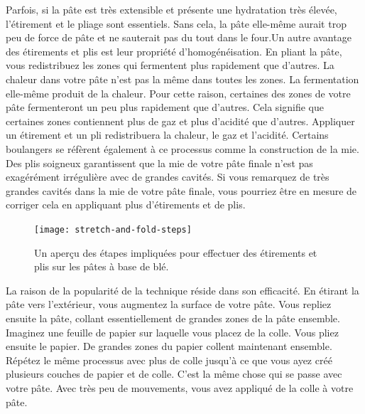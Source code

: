 Parfois, si la pâte est très extensible
et présente une hydratation très élevée, l'étirement et le pliage sont essentiels.
Sans cela, la pâte elle-même aurait trop peu de force de pâte et ne
sauterait pas du tout dans le four.Un autre avantage des étirements et plis est leur propriété d'homogénéisation. En pliant la pâte, vous redistribuez les zones qui fermentent plus rapidement que d'autres. La chaleur dans votre pâte n'est pas la même dans toutes les zones. La fermentation elle-même produit de la chaleur. Pour cette raison, certaines des zones de votre pâte fermenteront un peu plus rapidement que d'autres. Cela signifie que certaines zones contiennent plus de gaz et plus d'acidité que d'autres. Appliquer un étirement et un pli redistribuera la chaleur, le gaz et l'acidité. Certains boulangers se réfèrent également à ce processus comme la construction de la mie. Des plis soigneux garantissent que la mie de votre pâte finale n'est pas exagérément irrégulière avec de grandes cavités. Si vous remarquez de très grandes cavités dans la mie de votre pâte finale, vous pourriez être en mesure de corriger cela en appliquant plus d'étirements et de plis.

\begin{figure}[!htb]
  \texttt{[image: stretch-and-fold-steps]}
  \caption[Étapes de l'étirement et du pli]{Un aperçu des étapes impliquées pour effectuer des étirements et plis sur les pâtes à base de blé.}%
  \label{figure:stretch-and-fold-steps}
\end{figure}

La raison de la popularité de la technique réside dans son efficacité. En étirant la pâte vers l'extérieur, vous augmentez la surface de votre pâte. Vous repliez ensuite la pâte, collant essentiellement de grandes zones de la pâte ensemble. Imaginez une feuille de papier sur laquelle vous placez de la colle. Vous pliez ensuite le papier. De grandes zones du papier collent maintenant ensemble. Répétez le même processus avec plus de colle jusqu'à ce que vous ayez créé plusieurs couches de papier et de colle. C'est la même chose qui se passe avec votre pâte. Avec très peu de mouvements, vous avez appliqué de la colle à votre pâte.

